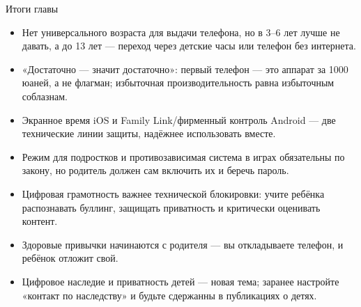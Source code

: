 \begin{tcbsummary}{Итоги главы}
\begin{itemize}
  \item Нет универсального возраста для выдачи телефона, но в 3–6 лет лучше не давать, а до 13 лет — переход через детские часы или телефон без интернета.
  \item «Достаточно — значит достаточно»: первый телефон — это аппарат за 1000 юаней, а не флагман; избыточная производительность равна избыточным соблазнам.
  \item Экранное время iOS и Family Link/фирменный контроль Android — две технические линии защиты, надёжнее использовать вместе.
  \item Режим для подростков и противозависимая система в играх обязательны по закону, но родитель должен сам включить их и беречь пароль.
  \item Цифровая грамотность важнее технической блокировки: учите ребёнка распознавать буллинг, защищать приватность и критически оценивать контент.
  \item Здоровые привычки начинаются с родителя — вы откладываете телефон, и ребёнок отложит свой.
  \item Цифровое наследие и приватность детей — новая тема; заранее настройте «контакт по наследству» и будьте сдержанны в публикациях о детях.
\end{itemize}

\end{tcbsummary}
